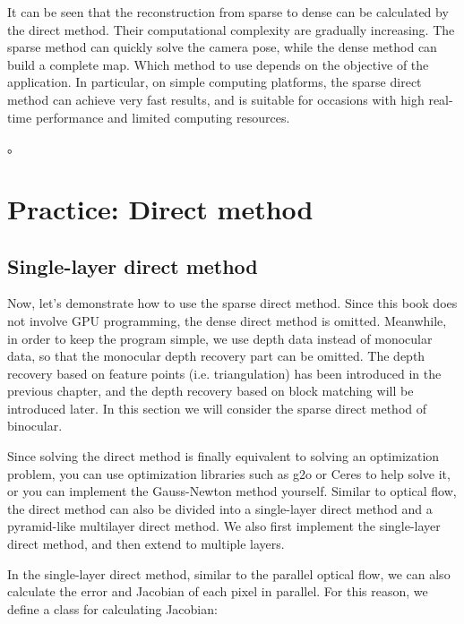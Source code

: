 It can be seen that the reconstruction from sparse to dense can be calculated by the direct method. Their computational complexity are gradually increasing. The sparse method can quickly solve the camera pose, while the dense method can build a complete map. Which method to use depends on the objective of the application. In particular, on simple computing platforms, the sparse direct method can achieve very fast results, and is suitable for occasions with high real-time performance and limited computing resources.

\textsuperscript{\cite{Engel2016}}。

\section{Practice: Direct method}
\subsection{Single-layer direct method}
Now, let's demonstrate how to use the sparse direct method. Since this book does not involve GPU programming, the dense direct method is omitted. Meanwhile, in order to keep the program simple, we use depth data instead of monocular data, so that the monocular depth recovery part can be omitted. The depth recovery based on feature points (i.e. triangulation) has been introduced in the previous chapter, and the depth recovery based on block matching will be introduced later. In this section we will consider the sparse direct method of binocular.

Since solving the direct method is finally equivalent to solving an optimization problem, you can use optimization libraries such as g2o or Ceres to help solve it, or you can implement the Gauss-Newton method yourself. Similar to optical flow, the direct method can also be divided into a single-layer direct method and a pyramid-like multilayer direct method. We also first implement the single-layer direct method, and then extend to multiple layers.

In the single-layer direct method, similar to the parallel optical flow, we can also calculate the error and Jacobian of each pixel in parallel. For this reason, we define a class for calculating Jacobian:

